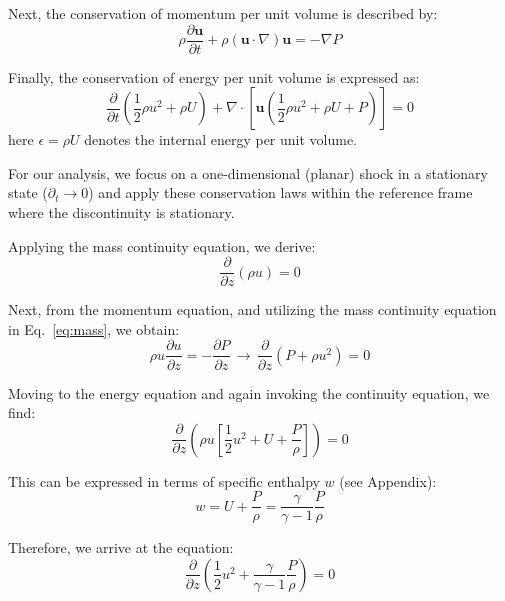 Next, the conservation of momentum per unit volume is described by:
%
\begin{equation}
\rho \frac{\partial \mathbf{u}}{\partial t} + \rho (\mathbf{u} \cdot \nabla) \mathbf{u} = -\nabla P
\end{equation}

Finally, the conservation of energy per unit volume is expressed as:
%
\begin{equation}
\frac{\partial}{\partial t} \left( \frac{1}{2} \rho u^2 + \rho U \right) + \nabla \cdot \left[ \mathbf{u} \left( \frac{1}{2} \rho u^2 + \rho U + P \right) \right] = 0
\end{equation}
%
here \( \epsilon = \rho U \) denotes the internal energy per unit volume.

For our analysis, we focus on a one-dimensional (planar) shock in a stationary state (\( \partial_t \rightarrow 0 \)) and apply these conservation laws within the reference frame where the discontinuity is stationary.

Applying the mass continuity equation, we derive:
%
\begin{equation}\label{eq:mass}
\frac{\partial}{\partial z} (\rho u) = 0
\end{equation}

Next, from the momentum equation, and utilizing the mass continuity equation in Eq.~\ref{eq:mass}, we obtain:
%
\begin{equation}
\rho u \frac{\partial u}{\partial z} = -\frac{\partial P}{\partial z}  \, \rightarrow \, \frac{\partial}{\partial z} (P + \rho u^2) = 0 
\end{equation}


Moving to the energy equation and again invoking the continuity equation, we find:
%
\begin{equation}
\frac{\partial}{\partial z} \left( \rho u \left[ \frac{1}{2} u^2 + U + \frac{P}{\rho} \right] \right) = 0 
\end{equation}

This can be expressed in terms of specific enthalpy \( w \) (see Appendix):
%
\begin{equation}
w = U + \frac{P}{\rho} = \frac{\gamma}{\gamma - 1}\frac{P}{\rho}
\end{equation}

Therefore, we arrive at the equation:
%
\begin{equation}
\frac{\partial}{\partial z} \left( \frac{1}{2} u^2 + \frac{\gamma}{\gamma - 1}\frac{P}{\rho} \right) = 0 
\end{equation}

